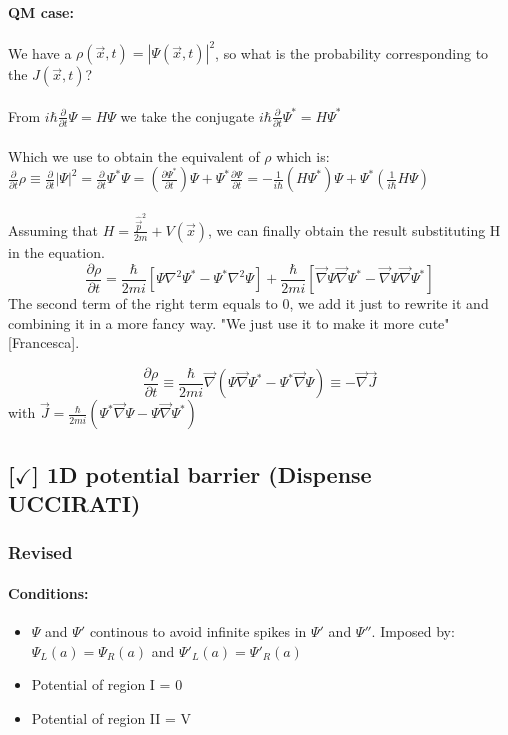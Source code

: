 \paragraph{QM case:} We have a $\rho(\vec{x}, t) = |\Psi(\vec{x}, t)|^2$, so what is the probability corresponding to the $J(\vec{x}, t)$?
\\\\
From $i\hbar \frac{\partial}{\partial t}\Psi = H\Psi$ we take the conjugate $i\hbar \frac{\partial}{\partial t}\Psi^* = H\Psi^*$
\\\\
Which we use to obtain the equivalent of $\rho$ which is: $\frac{\partial}{\partial t}\rho \equiv \frac{\partial}{\partial t} |\Psi|^2 = \frac{\partial}{\partial t}\Psi^*\Psi = (\frac{\partial \Psi^*}{\partial t})\Psi + \Psi^* \frac{\partial \Psi}{\partial t} = -\frac{1}{i\hbar}(H\Psi^*)\Psi + \Psi^*(\frac{1}{i\hbar} H \Psi)$
\\\\
Assuming that $H = \frac{\hat{\vec{p}}^2}{2m} + V(\vec{x})$, we can finally obtain the result substituting H in the equation.
$$\frac{\partial \rho}{\partial t} = \frac{\hbar}{2mi}[\Psi \nabla^2 \Psi^* - \Psi^*\nabla^2\Psi] + \frac{\hbar}{2mi}[\vec{\nabla}\Psi \vec{\nabla}\Psi^* - \vec{\nabla}\Psi \vec{\nabla}\Psi^*]$$
The second term of the right term equals to 0, we add it just to rewrite it and combining it in a more fancy way. "We just use it to make it more cute" [Francesca].

$$\frac{\partial \rho}{\partial t} \equiv \frac{\hbar}{2mi}\vec{\nabla}(\Psi\vec{\nabla}\Psi^* - \Psi^*\vec{\nabla}\Psi) \equiv -\vec{\nabla}\vec{J}$$
with $\vec{J} = \frac{\hbar}{2mi} (\Psi^*\vec{\nabla}\Psi - \Psi\vec{\nabla}\Psi^*)$

\subsection{[$\checkmark$] 1D potential barrier (Dispense UCCIRATI)}

\subsubsection{Revised}
\paragraph{Conditions:}

\begin{itemize}
    \item $\Psi$ and $\Psi'$ continous to avoid infinite spikes in $\Psi'$ and $\Psi''$. Imposed by: $\Psi_{L}(a) = \Psi_{R}(a)$ and $\Psi'_{L}(a) = \Psi'_{R}(a)$
    \item Potential of region I = 0
    \item Potential of region II = V
\end{itemize}

